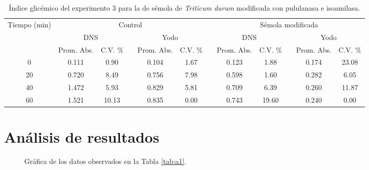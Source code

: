\documentclass{article}
\begin{document}
\begin{table}[H]
	\centering
	\caption{Índice glicémico del experimento 3 para la de sémola de \textit{Triticum durum} modificada con pululanasa e isoamilasa.}
		\begin{adjustbox}{width=\textwidth}
	\begin{tabular}{cccccccccccc}
		\toprule
		\multicolumn{1}{c}{\multirow{3}[6]{*}{Tiempo (min)}} & \multicolumn{5}{c}{Control}           &       & \multicolumn{5}{c}{Sémola modificada} \\
		\cmidrule{2-6}\cmidrule{8-12}          & \multicolumn{2}{c}{DNS} &       & \multicolumn{2}{c}{Yodo} &       & \multicolumn{2}{c}{DNS} &       & \multicolumn{2}{c}{Yodo} \\
		\cmidrule{2-3}\cmidrule{5-6}\cmidrule{8-9}\cmidrule{11-12}          & Prom. Abs. & C.V. \% &       & Prom. Abs. & C.V. \% &       & Prom. Abs. & C.V. \% &       & Prom. Abs. & C.V. \% \\
		\midrule
		0     & 0.111 & 0.90  &       & 0.104 & 1.67  &       & 0.123 & 1.88  &       & 0.174 & 23.08 \\
		20    & 0.720 & 8.49  &       & 0.756 & 7.98  &       & 0.598 & 1.60  &       & 0.282 & 6.05 \\
		40    & 1.472 & 5.93  &       & 0.829 & 5.81  &       & 0.709 & 6.39  &       & 0.260 & 11.87 \\
		60    & 1.521 & 10.13 &       & 0.835 & 0.00  &       & 0.743 & 19.60 &       & 0.240 & 0.00 \\
		\bottomrule
	\end{tabular}%
	\end{adjustbox}
	\label{tab:e3.3}%
\end{table}%



\section{Análisis de resultados}


\begin{figure}[H]
	\centering
	
	\caption{Gráfica de los datos observados en la Tabla \ref{tab:a1}. }
	\label{g1.1}
\end{figure}
\end{document}
